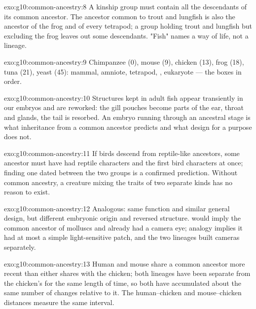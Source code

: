 \begin{solution}{exo:g10:common-ancestry:8}
A kinship group must contain all the descendants of its common
ancestor. The ancestor common to trout and lungfish is also the
ancestor of the frog and of every tetrapod; a group holding trout and
lungfish but excluding the frog leaves out some descendants. "Fish"
names a way of life, not a lineage.
\end{solution}

\begin{solution}{exo:g10:common-ancestry:9}
Chimpanzee (0), mouse (9), chicken (13), frog (18), tuna (21), yeast
(45): mammal, amniote, tetrapod, , eukaryote --- the boxes
in order.
\end{solution}

\begin{solution}{exo:g10:common-ancestry:10}
Structures kept in adult fish appear transiently in our embryos and are
reworked: the gill pouches become parts of the ear, throat and glands,
the tail is resorbed. An embryo running through an ancestral stage is
what inheritance from a common ancestor predicts and what design for
a purpose does not.
\end{solution}

\begin{solution}{exo:g10:common-ancestry:11}
If birds descend from reptile-like ancestors, some ancestor must have
had reptile characters and the first bird characters at once; finding
one dated between the two groups is a confirmed prediction. Without
common ancestry, a creature mixing the traits of two separate kinds
has no reason to exist.
\end{solution}

\begin{solution}{exo:g10:common-ancestry:12}
Analogous: same function and similar general design, but different
embryonic origin and reversed structure.  would imply the
common ancestor of molluscs and  already had a camera eye;
analogy implies it had at most a simple light-sensitive patch, and the
two lineages built cameras separately.
\end{solution}

\begin{solution}{exo:g10:common-ancestry:13}
Human and mouse share a common ancestor more recent than either shares
with the chicken; both lineages have been separate from the chicken's
for the same length of time, so both have accumulated about the same
number of changes relative to it. The human--chicken and mouse--chicken
distances measure the same interval.
\end{solution}

